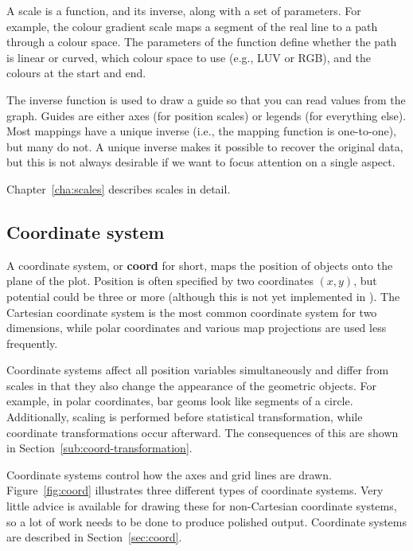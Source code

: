 A scale is a function, and its inverse, along with a set of parameters. For example, the colour gradient scale maps a segment of the real line to a path through a colour space. The parameters of the function define whether the path is linear or curved, which colour space to use (e.g., LUV or RGB), and the colours at the start and end.

The inverse function is used to draw a guide so that you can read values from the graph.  Guides are either axes (for position scales) or legends (for everything else).  Most mappings have a unique inverse (i.e., the mapping function is one-to-one), but many do not.  A unique inverse makes it possible to recover the original data, but this is not always desirable if we want to focus attention on a single aspect.

Chapter~\ref{cha:scales} describes scales in detail.

\subsection{Coordinate system}\label{sec:coordinate_systems}

A coordinate system, or {\bf coord} for short, maps the position of objects onto the plane of the plot. Position is often specified by two coordinates $(x, y)$, but potential could be three or more (although this is not yet implemented in \ggplot). The Cartesian coordinate system is the most common coordinate system for two dimensions, while polar coordinates and various map projections are used less frequently.

Coordinate systems affect all position variables simultaneously and differ from scales in that they also change the appearance of the geometric objects. For example, in polar coordinates, bar geoms look like segments of a circle. Additionally, scaling is performed before statistical transformation, while coordinate transformations occur afterward. The consequences of this are shown in Section~\ref{sub:coord-transformation}.

Coordinate systems control how the axes and grid lines are drawn.  Figure~\ref{fig:coord} illustrates three different types of coordinate systems.  Very little advice is available for drawing these for non-Cartesian coordinate systems, so a lot of work needs to be done to produce polished output.  Coordinate systems are described in Section~\ref{sec:coord}.

% 


